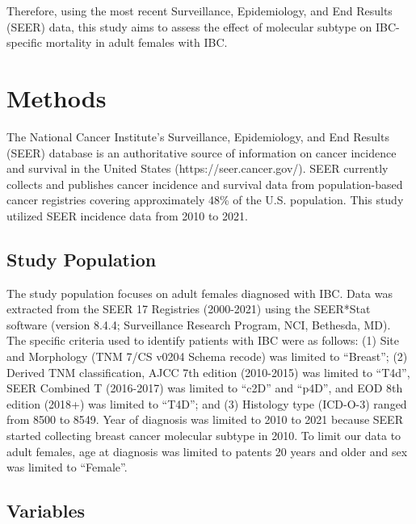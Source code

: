 \documentclass[
  letterpaper,
  DIV=11,
  numbers=noendperiod]{scrartcl}
\begin{document}
Therefore, using the most recent Surveillance, Epidemiology, and End
Results (SEER) data, this study aims to assess the effect of molecular
subtype on IBC-specific mortality in adult females with IBC.

\section{Methods}\label{methods}

The National Cancer Institute's Surveillance, Epidemiology, and End
Results (SEER) database is an authoritative source of information on
cancer incidence and survival in the United States
(https://seer.cancer.gov/). SEER currently collects and publishes cancer
incidence and survival data from population-based cancer registries
covering approximately 48\% of the U.S. population. This study utilized
SEER incidence data from 2010 to 2021.

\subsection{Study Population}\label{study-population}

The study population focuses on adult females diagnosed with IBC. Data
was extracted from the SEER 17 Registries (2000-2021) using the
SEER*Stat software (version 8.4.4; Surveillance Research Program, NCI,
Bethesda, MD). The specific criteria used to identify patients with IBC
were as follows: (1) Site and Morphology (TNM 7/CS v0204 Schema recode)
was limited to ``Breast''; (2) Derived TNM classification, AJCC 7th
edition (2010-2015) was limited to ``T4d'', SEER Combined T (2016-2017)
was limited to ``c2D'' and ``p4D'', and EOD 8th edition (2018+) was
limited to ``T4D''; and (3) Histology type (ICD-O-3) ranged from 8500 to
8549. Year of diagnosis was limited to 2010 to 2021 because SEER started
collecting breast cancer molecular subtype in 2010. To limit our data to
adult females, age at diagnosis was limited to patents 20 years and
older and sex was limited to ``Female''.

\subsection{Variables}\label{variables}
\end{document}
